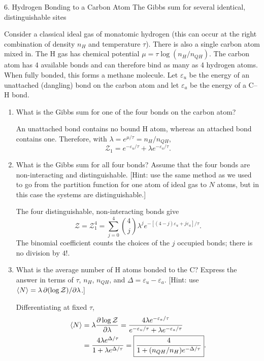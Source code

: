 \documentclass[11pt]{article}
\begin{document}
\begin{problem}{6. Hydrogen Bonding to a Carbon Atom}
The Gibbs sum for several identical, distinguishable sites

Consider a classical ideal gas of monatomic hydrogen (this can occur at the right combination of density \(n_H\) and temperature \(\tau\)).
There is also a single carbon atom mixed in.
The H gas has chemical potential \(\mu=\tau\log(n_H/n_{QH})\).
The carbon atom has 4 available bonds and can therefore bind as many as 4 hydrogen atoms.
When fully bonded, this forms a methane molecule.
Let \(\varepsilon_u\) be the energy of an unattached (dangling) bond on the carbon atom and let \(\varepsilon_a\) be the energy of a C--H bond.
\begin{enumerate}[label=(\alph*)]
  \item What is the Gibbs sum for one of the four bonds on the carbon atom?
  \begin{answer}
An unattached bond contains no bound H atom, whereas an attached bond contains one. Therefore, with \(\lambda=e^{\mu/\tau}=n_H/n_{QH}\),
\begin{equation}
\label{eq:p6-single-bond}
\boxed{\mathcal Z_1=e^{-\varepsilon_u/\tau}+\lambda e^{-\varepsilon_a/\tau}}.
\end{equation}
\end{answer}
\item What is the Gibbs sum for all four bonds?
  Assume that the four bonds are non-interacting and distinguishable.
  [Hint: use the same method as we used to go from the partition function for one atom of ideal gas to \(N\) atoms, but in this case the systems are distinguishable.]
  \begin{answer}
The four distinguishable, non-interacting bonds give
\begin{equation}
\label{eq:p6-four-bonds}
\boxed{\mathcal Z=\mathcal Z_1^4
=\sum_{j=0}^4\binom4j\lambda^j
e^{-[(4-j)\varepsilon_u+j\varepsilon_a]/\tau}}.
\end{equation}
The binomial coefficient counts the choices of the \(j\) occupied bonds; there is no division by \(4!\).
\end{answer}
\item What is the average number of H atoms bonded to the C?
  Express the answer in terms of \(\tau\), \(n_H\), \(n_{QH}\), and \(\Delta=\varepsilon_u-\varepsilon_a\).
  [Hint: use \(\ev{N}=\lambda\,\partial(\log\mathcal{Z})/\partial\lambda\).]
\begin{answer}
Differentiating at fixed \(\tau\),
\begin{equation}
\label{eq:p6-average}
\begin{aligned}
\ev N&=\lambda\frac{\partial\log\mathcal Z}{\partial\lambda}
=\frac{4\lambda e^{-\varepsilon_a/\tau}}{e^{-\varepsilon_u/\tau}+\lambda e^{-\varepsilon_a/\tau}}\\
&=\frac{4\lambda e^{\Delta/\tau}}{1+\lambda e^{\Delta/\tau}}
=\boxed{\frac{4}{1+(n_{QH}/n_H)e^{-\Delta/\tau}}}.
\end{aligned}
\end{equation}
\end{answer}
\end{enumerate}
\end{problem}
\end{document}
